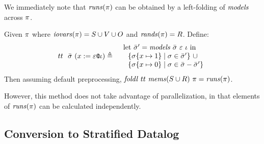 We immediately note that $\mathit{runs}(\pi)$ can be obtained by a left-folding
of $\mathit{models}$ across $\pi$. 
\begin{lemma}
  \label{lemma-cruns}
  Given $\pi$ where $\mathit{iovars}(\pi) = S \cup V \cup O$ and $\mathit{rands}(\pi) = R$. Define:
  \begin{eqnarray*}
    {tt}\ \ \stores\ (\xassign{x}{\be}{\cid}) &\defeq& \begin{array}{l}
      \mathrm{let}\ \stores' = \solve{\stores}{\be}{\cid}\ \mathrm{in}\\
      \ \ \{\extend{\store}{x}{1} \mid \store \in \stores' \}\ \cup\\
      \ \ \{\extend{\store}{x}{0} \mid \store \in \stores - \stores' \}\end{array}%
  \end{eqnarray*}
  Then assuming default preprocessing, $\mathit{foldl}\ {tt}\ \mathit{mems}(S \cup R)\ \pi = \mathit{runs}(\pi)$.
\end{lemma}
However, this method does not take advantage of parallelization,
in that elements of $\mathit{runs}(\pi)$ can be calculated independently.

\subsection{Conversion to Stratified Datalog}

